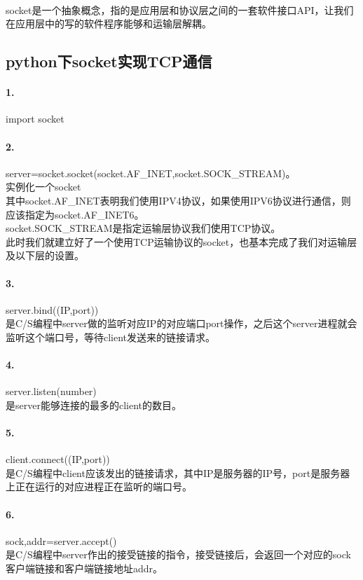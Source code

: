 \documentclass[12pt]{article}
\begin{document}
\begin{CJK}{UTF8}{gbsn}
\paragraph{}socket是一个抽象概念，指的是应用层和协议层之间的一套软件接口API，让我们在应用层中的写的软件程序能够和运输层解耦。
\subsection{python下socket实现TCP通信}
\paragraph{1.}import socket
\paragraph{2.}server=socket.socket(socket.AF\_INET,socket.SOCK\_STREAM)。 \\实例化一个socket
\\其中socket.AF\_INET表明我们使用IPV4协议，如果使用IPV6协议进行通信，则应该指定为socket.AF\_INET6。
\\socket.SOCK\_STREAM是指定运输层协议我们使用TCP协议。
\\此时我们就建立好了一个使用TCP运输协议的socket，也基本完成了我们对运输层及以下层的设置。
\paragraph{3.}server.bind((IP,port))
\\是C/S编程中server做的监听对应IP的对应端口port操作，之后这个server进程就会监听这个端口号，等待client发送来的链接请求。
\paragraph{4.}server.listen(number)
\\是server能够连接的最多的client的数目。
\paragraph{5.}client.connect((IP,port)) 
\\是C/S编程中client应该发出的链接请求，其中IP是服务器的IP号，port是服务器上正在运行的对应进程正在监听的端口号。
\paragraph{6.}sock,addr=server.accept()
\\是C/S编程中server作出的接受链接的指令，接受链接后，会返回一个对应的sock客户端链接和客户端链接地址addr。

\end{CJK}
\end{document}
